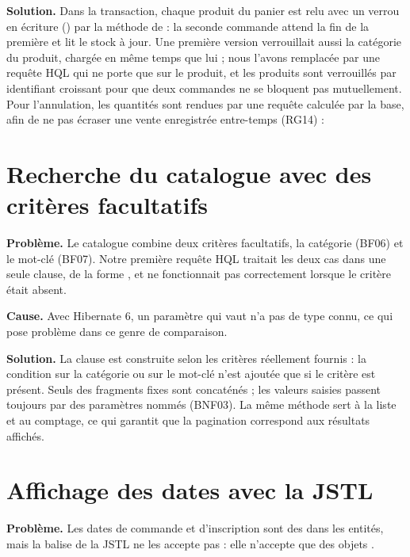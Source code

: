 \textbf{Solution.} Dans la transaction, chaque produit du panier est relu avec un verrou en écriture
() par la méthode  de  : la seconde
commande attend la fin de la première et lit le stock à jour. Une première version verrouillait aussi la catégorie du produit, chargée en
même temps que lui ; nous l'avons remplacée par une requête HQL qui ne porte que sur le produit, et les produits
sont verrouillés par identifiant croissant pour que deux commandes ne se bloquent pas mutuellement. Pour
l'annulation, les quantités sont rendues par une requête calculée par la base, afin de ne pas écraser une vente
enregistrée entre-temps (RG14) :
\begin{center}
\end{center}

\section{Recherche du catalogue avec des critères facultatifs}

\textbf{Problème.} Le catalogue combine deux critères facultatifs, la catégorie (BF06) et le mot-clé (BF07).
Notre première requête HQL traitait les deux cas dans une seule clause, de la forme
, et ne fonctionnait pas correctement lorsque le
critère était absent.

\textbf{Cause.} Avec Hibernate 6, un paramètre qui vaut  n'a pas de type connu, ce qui pose problème
dans ce genre de comparaison.

\textbf{Solution.} La clause  est construite selon les critères réellement fournis : la condition
sur la catégorie ou sur le mot-clé n'est ajoutée que si le critère est présent. Seuls des fragments fixes sont
concaténés ; les valeurs saisies passent toujours par des paramètres nommés (BNF03). La même méthode sert à la
liste et au comptage, ce qui garantit que la pagination correspond aux résultats affichés.

\section{Affichage des dates  avec la JSTL}

\textbf{Problème.} Les dates de commande et d'inscription sont des  dans les entités, mais
la balise  de la JSTL ne les accepte pas : elle n'accepte que des objets
.

